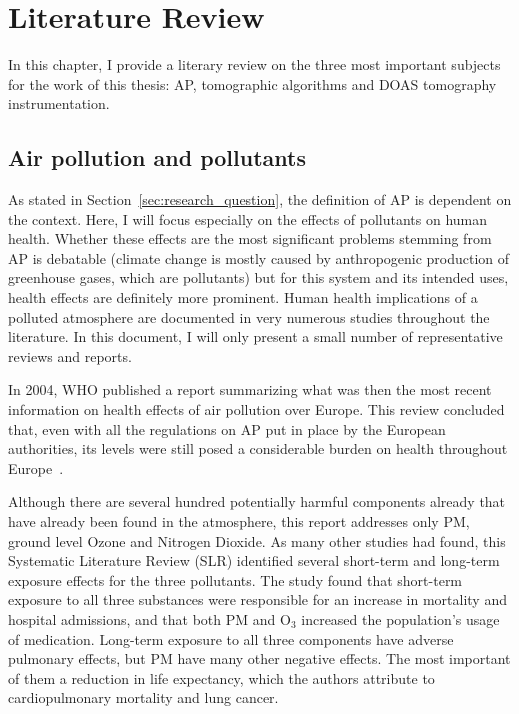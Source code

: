 \chapter{Literature Review}
\label{cha:literature_review}

In this chapter, I provide a literary review on the three most important
subjects for the work of this thesis: \gls{AP}, tomographic algorithms
and \gls{DOAS} tomography instrumentation.

\section{Air pollution and pollutants}%
\label{sec:air_pollution_and_pollutants}

As stated in Section~\ref{sec:research_question}, the definition of
\gls{AP} is dependent on the context. Here, I will focus especially on
the effects of pollutants on human health. Whether these effects are the
most significant problems stemming from \gls{AP} is debatable (climate
change is mostly caused by anthropogenic production of greenhouse gases,
which are pollutants) but for this system and its intended uses, health
effects are definitely more prominent. Human health implications of a
polluted atmosphere are documented in very numerous studies throughout
the literature. In this document, I will only present a small number of
representative reviews and reports.

In 2004, \gls{WHO} published a report summarizing what was then the most
recent information on health effects of air pollution over Europe. This
review concluded that, even with all the regulations on \gls{AP} put in
place by the European authorities, its levels were still posed a
considerable burden on health throughout
Europe~\cite{WorldHealthOrganisationEurope2004}.

Although there are several hundred potentially harmful components
already that have already been found in the atmosphere, this report
addresses only \gls{PM}, ground level Ozone and Nitrogen Dioxide. As
many other studies had found, this Systematic Literature Review
(\gls{SLR}) identified several short-term and long-term exposure effects
for the three pollutants. The study found that short-term exposure to
all three substances were responsible for an increase in mortality and
hospital admissions, and that both \gls{PM} and O$_3$ increased the
population's usage of medication. Long-term exposure to all three
components have adverse pulmonary effects, but \gls{PM} have many other
negative effects. The most important of them a reduction in life
expectancy, which the authors attribute to cardiopulmonary mortality and
lung cancer.


